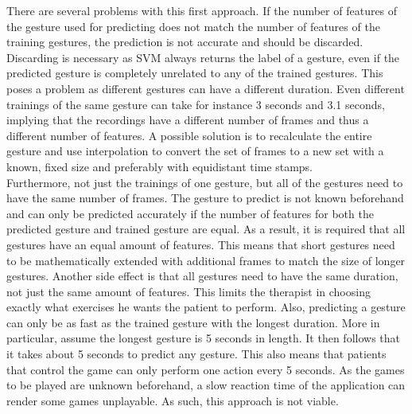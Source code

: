 There are several problems with this first approach. If the number of features of the gesture used for predicting does not match the number of features of the training gestures, the prediction is not accurate and should be discarded. Discarding is necessary as SVM always returns the label of a gesture, even if the predicted gesture is completely unrelated to any of the trained gestures. This poses a problem as different gestures can have a different duration. Even different trainings of the same gesture can take for instance 3 seconds and 3.1 seconds, implying that the recordings have a different number of frames and thus a different number of features. A possible solution is to recalculate the entire gesture and use interpolation to convert the set of frames to a new set with a known, fixed size and preferably with equidistant time stamps.\\

Furthermore, not just the trainings of one gesture, but all of the gestures need to have the same number of frames. The gesture to predict is not known beforehand and can only be predicted accurately if the number of features for both the predicted gesture and trained gesture are equal. As a result, it is required that all gestures have an equal amount of features. This means that short gestures need to be mathematically extended with additional frames to match the size of longer gestures. Another side effect is that all gestures need to have the same duration, not just the same amount of features. This limits the therapist in choosing exactly what exercises he wants the patient to perform. Also, predicting a gesture can only be as fast as the trained gesture with the longest duration. More in particular, assume the longest gesture is 5 seconds in length. It then follows that it takes about 5 seconds to predict any gesture. This also means that patients that control the game can only perform one action every 5 seconds. As the games to be played are unknown beforehand, a slow reaction time of the application can render some games unplayable. As such, this approach is not viable.\\

